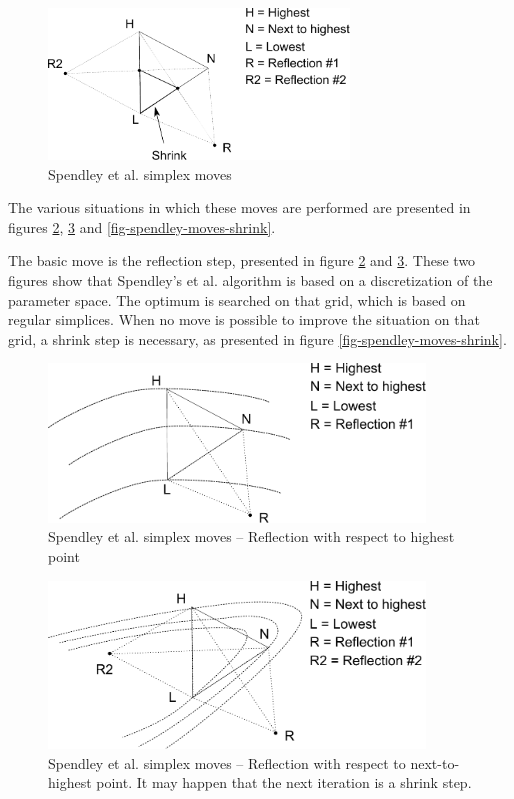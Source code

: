 \begin{figure}
\begin{center}
\includegraphics[width=8cm]{spendley-steps.pdf}
\end{center}
\caption{Spendley et al. simplex moves}
\label{fig-spendley-moves}
\end{figure}

The various situations in which these moves are performed are 
presented in figures \ref{fig-spendley-moves-reflect}, \ref{fig-spendley-moves-reflect2}
and \ref{fig-spendley-moves-shrink}.

The basic move is the reflection step, presented in figure 
\ref{fig-spendley-moves-reflect} and \ref{fig-spendley-moves-reflect2}. 
These two figures show that Spendley's et al.
algorithm is based on a discretization of the parameter space. 
The optimum is searched on that grid, which is based on regular simplices.
When no move is possible to improve the situation on that grid,
a shrink step is necessary, as presented in figure \ref{fig-spendley-moves-shrink}.

\begin{figure}
\begin{center}
\includegraphics[width=10cm]{spendley-steps-reflect.pdf}
\end{center}
\caption{Spendley et al. simplex moves -- Reflection with respect to highest point}
\label{fig-spendley-moves-reflect}
\end{figure}

\begin{figure}
\begin{center}
\includegraphics[width=10cm]{spendley-steps-reflect2.pdf}
\end{center}
\caption{Spendley et al. simplex moves -- Reflection with respect to next-to-highest point. 
It may happen that the next iteration is a shrink step.}
\label{fig-spendley-moves-reflect2}
\end{figure}

